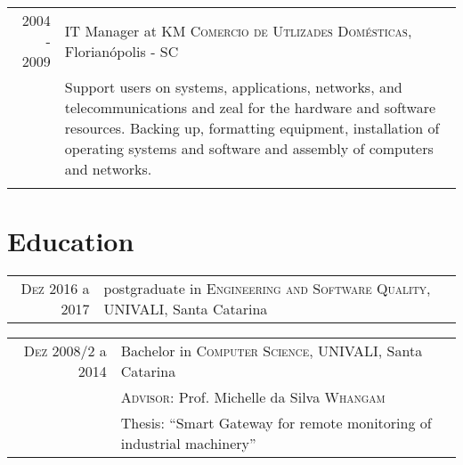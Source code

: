 \documentclass[a4paper,10pt]{article}
\begin{document}
\begin{tabular}{r|p{11cm}}
\textsc{2004 - 2009} & IT Manager at \textsc{KM Comercio de Utlizades Domésticas}, Florianópolis - SC \\&\footnotesize{Support users on systems, applications, networks, and telecommunications and zeal for the hardware and software resources. Backing up, formatting equipment, installation of operating systems and software and assembly of computers and networks.}\\\multicolumn{2}{c}{} \\ 

\end{tabular}

\section{Education}

\begin{tabular}{rl}	

\textsc{Dez} 2016 a 2017 & postgraduate in \textsc{Engineering and Software Quality}, UNIVALI, Santa Catarina\\

\end{tabular}


\begin{tabular}{rl}	

\textsc{Dez} 2008/2 a 2014 & Bachelor in \textsc{Computer Science}, UNIVALI, Santa Catarina\\
&\normalsize \textsc{Advisor}: Prof. Michelle da Silva \textsc{Whangam}\\
& Thesis: ``Smart Gateway for remote monitoring of industrial machinery''

\end{tabular}

\end{document}
